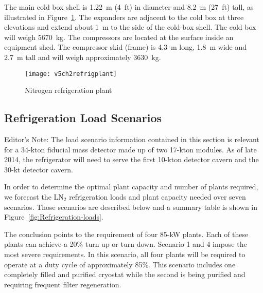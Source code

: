 The main cold box shell is 1.22~m (4~ft) in diameter and 8.2~m (27~ft) tall, as illustrated in
Figure~\ref{fig:nitrogren-refrigerator}.  The expanders are adjacent to the cold box at three elevations and extend about 1~m to the side of the cold-box shell.  The cold box will weigh 5670~kg. The compressors are located at the surface inside an equipment shed. The compressor skid (frame) is 4.3~m long, 1.8~m wide and 2.7~m tall and will weigh approximately 3630~kg.  

\begin{figure}[htbp]
\centering
\texttt{[image: v5ch2refrigplant]}
\caption{Nitrogen refrigeration plant}
\label{fig:nitrogren-refrigerator}
\end{figure}

\subsection{Refrigeration Load Scenarios}

\begin{editornote}
  Editor's Note:  The load scenario information contained in this section is relevant for a 34-kton fiducial mass detector made up of two 17-kton modules.  As of late 2014, the refrigerator will need to serve the first 10-kton detector cavern and the 30-kt detector cavern.
\end{editornote}

In order to determine the optimal plant capacity and number of plants required, we forecast the LN$_2$ refrigeration loads and plant capacity needed over seven scenarios.  Those scenarios are described below and a summary table is shown in Figure~\ref{fig:Refrigeration-loads}. 

The conclusion points to the requirement of four 85-kW plants.  Each of these plants can achieve a 20\% turn up or turn down.  Scenario 1 and 4 impose the most severe requirements. In this scenario, all four plants will be required to operate at a duty cycle of approximately 85\%. This scenario includes one completely filled and purified cryostat while the second is being purified and requiring frequent filter regeneration.

